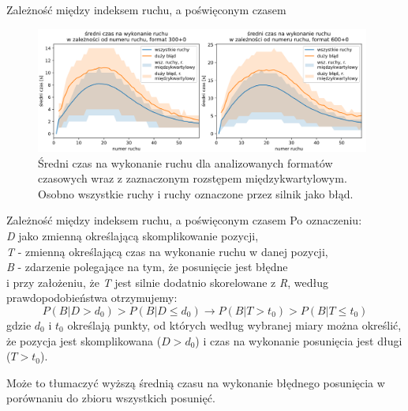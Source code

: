 \documentclass{beamer}
\begin{document}
\begin{frame}{Zależność między indeksem ruchu, a poświęconym czasem}
	\begin{figure}[H]
		\centering
		\includegraphics[width=11cm]{../Formatka/sr_czas_na_ruch.png}
		\caption{Średni czas na wykonanie ruchu dla analizowanych formatów czasowych wraz z zaznaczonym rozstępem międzykwartylowym. Osobno wszystkie ruchy i ruchy oznaczone przez silnik jako błąd.}
		\label{rys:sr_czas_na_ruch}
	\end{figure}
\end{frame}

\begin{frame}{Zależność między indeksem ruchu, a poświęconym czasem}
	Po oznaczeniu:\\ 
	\textit{D} jako zmienną określającą skomplikowanie pozycji,\\ \textit{T} - zmienną określającą czas na wykonanie ruchu w danej pozycji,\\ \textit{B} - zdarzenie polegające na tym, że posunięcie jest błędne\\
	 i przy założeniu, że \textit{T} jest silnie dodatnio skorelowane z \textit{R}, według prawdopodobieństwa otrzymujemy:
	\begin{equation*}
		P(B|D>d_0) > P(B|D\leq d_0) \rightarrow P(B|T>t_0) > P(B|T\leq t_0)
	\end{equation*}
	gdzie $d_0$ i $t_0$ określają punkty, od których według wybranej miary można określić, że pozycja jest skomplikowana ($D>d_0$) i czas na wykonanie posunięcia jest długi ($T>t_0$).
	
	
	Może to tłumaczyć wyższą średnią czasu na wykonanie błędnego posunięcia w porównaniu do zbioru wszystkich posunięć.
\end{frame}
\end{document}
